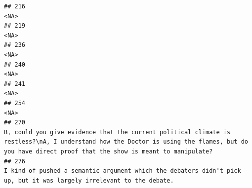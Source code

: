 \documentclass[
]{article}
\begin{document}
\begin{verbatim}
## 216                                                                                                                                                                                                                                                                                                                                                <NA>
## 219                                                                                                                                                                                                                                                                                                                                                <NA>
## 236                                                                                                                                                                                                                                                                                                                                                <NA>
## 240                                                                                                                                                                                                                                                                                                                                                <NA>
## 241                                                                                                                                                                                                                                                                                                                                                <NA>
## 254                                                                                                                                                                                                                                                                                                                                                <NA>
## 270                                                                                                                                                  B, could you give evidence that the current political climate is restless?\nA, I understand how the Doctor is using the flames, but do you have direct proof that the show is meant to manipulate?
## 276                                                                                                                                                                                                                               I kind of pushed a semantic argument which the debaters didn't pick up, but it was largely irrelevant to the debate. 

\end{verbatim}
\end{document}
